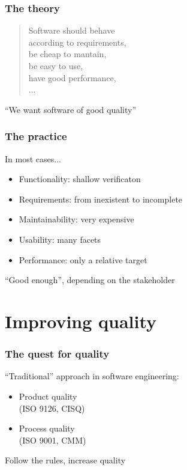 \documentclass[17pt,aspectratio=169,hyperref=pdfusetitle]{beamer}
\begin{document}
\begin{frame}[fragile]
  \frametitle{The theory}

  {\em
    \begin{quote}
      Software should behave \\
      according to requirements, \\
      be cheap to mantain, \\
      be easy to use, \\
      have good performance, \\
      ... \\
      \end{quote}
  }

  {\large
  ``We want software of good quality''
  }
\end{frame}

\begin{frame}[fragile]
  \frametitle{The practice}

  In most cases...
  
  \begin{itemize}
  \item Functionality: shallow verificaton
  \item Requirements: from inexistent to incomplete
  \item Maintainability: very expensive
  \item Usability: many facets
  \item Performance: only a relative target
  \end{itemize}

  ``Good enough'', depending on the stakeholder
  
\end{frame}

\section{Improving quality}

\begin{frame}[fragile]
  \frametitle{The quest for quality}

  ``Traditional'' approach in software engineering:
  
  \begin{itemize}
  \item Product quality \\
    (ISO 9126, CISQ)
  \item Process quality \\
    (ISO 9001, CMM)
  \end{itemize}

  Follow the rules, increase quality
\end{frame}
\end{document}
